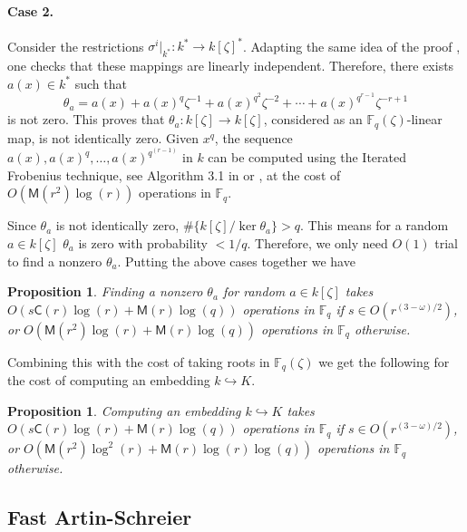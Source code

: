 \documentclass[12pt]{article}
\theoremstyle{plain}
\newtheorem{proposition}[theorem]{Proposition}
\theoremstyle{definition}
\def\F{\ensuremath{\mathbb{F}}}
\def\MM{\ensuremath{\mathsf{M}}}
\def\CC{\ensuremath{\mathsf{C}}}
\begin{document}
\paragraph{Case 2.}
Consider the restrictions $\sigma^i \vert_{k^*}: k^* \rightarrow k[\zeta]^*$. Adapting the same 
idea of the proof \cite[Ch VI, Theorem 4.1]{lang}, one checks that these mappings are linearly 
independent. Therefore, there exists $a(x) \in k^*$ such that 
\[ \theta_a = a(x) + a(x)^q\zeta^{-1} + a(x)^{q^2}\zeta^{-2} + \cdots + a(x)^{q^{r - 1}}\zeta^{-r 
	+ 1}\]
is not zero. This proves that $\theta_a: k[\zeta] \rightarrow k[\zeta]$, considered as an 
$\F_q(\zeta)$-linear map, is not identically zero. Given $x^q$, the sequence $a(x), a(x)^q, \dots, 
a(x)^{q^{(r - 1)}}$ in $k$ can be computed using the Iterated Frobenius technique, see Algorithm 
3.1 in \cite{von1992computing} or \cite[Ch.~14.7]{vzGG}, at the cost of $O(\MM(r^2)\log(r))$ 
operations in $\F_q$.

Since $\theta_a$ is not identically zero, $\#\{k[\zeta] / \ker \theta_a \} > q$. This means for a 
random $a \in k[\zeta]$ $\theta_a$ is zero with probability $< 1 / q$. Therefore, we only need 
$O(1)$ trial to find a nonzero $\theta_a$. Putting the above cases together we have
\begin{proposition}
	\label{proposition:XiDelta-updated}
	Finding a nonzero $\theta_a$ for random $a \in k[\zeta]$ takes $O(s\CC(r)\log(r) + 
	\MM(r)\log(q))$ operations in $\F_q$ if $s \in O(r^{(3 - \omega) / 2})$, or $O(\MM(r^2)\log(r) 
	+ \MM(r)\log(q))$ operations in $\F_q$ otherwise.
\end{proposition}
Combining this with the cost of taking roots in $\F_q(\zeta)$ we get the following for the cost of 
computing an embedding $k \hookrightarrow K$.
\begin{proposition}
	\label{proposition:XiDelta-updated}
	Computing an embedding $k \hookrightarrow K$ takes $O(s\CC(r)\log(r) + \MM(r)\log(q))$ 
	operations in $\F_q$ if $s \in O(r^{(3 - \omega) / 2})$, or $O(\MM(r^2)\log^2(r) + 
	\MM(r)\log(r)\log(q))$ operations in $\F_q$ otherwise.
\end{proposition}




\subsection{Fast Artin-Schreier}
\label{sec:fast-artin-schreier}
\end{document}
